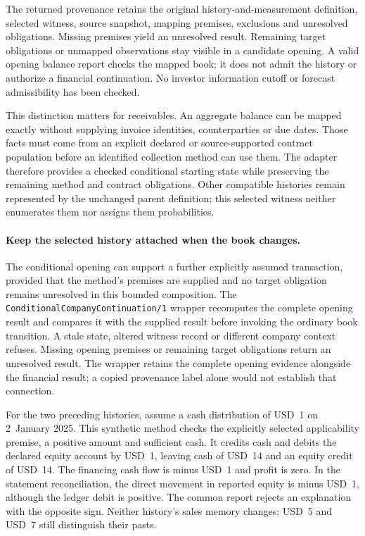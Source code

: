 The returned provenance retains the original history-and-measurement
definition, selected witness, source snapshot, mapping premises, exclusions
and unresolved obligations. Missing premises yield an unresolved result.
Remaining target obligations or unmapped observations stay visible in a
candidate opening. A valid opening balance report checks the mapped book;
it does not admit the history or authorize a financial continuation. No
investor information cutoff or forecast admissibility has been checked.

This distinction matters for receivables. An aggregate balance can be mapped
exactly without supplying invoice identities, counterparties or due dates.
Those facts must come from an explicit declared or source-supported contract
population before an identified collection method can use them. The adapter
therefore provides a checked conditional starting state while preserving the
remaining method and contract obligations. Other compatible histories remain
represented by the unchanged parent definition; this selected witness neither
enumerates them nor assigns them probabilities.


\paragraph{Keep the selected history attached when the book changes.}
The conditional opening can support a further explicitly assumed transaction,
provided that the method's premises are supplied and no target obligation
remains unresolved in this bounded composition. The
\texttt{ConditionalCompanyContinuation/1} wrapper recomputes the complete
opening result and compares it with the supplied result before invoking the
ordinary book transition. A stale state, altered witness record or different
company context refuses. Missing opening premises or remaining target
obligations return an unresolved result. The wrapper retains the complete
opening evidence alongside the financial result; a copied provenance label
alone would not establish that connection.

For the two preceding histories, assume a cash distribution of USD~1 on
2~January 2025. This synthetic method checks the explicitly selected
applicability premise, a positive amount and sufficient cash. It credits cash
and debits the declared equity account by USD~1, leaving cash of USD~14 and
an equity credit of USD~14. The financing cash flow is minus USD~1 and profit
is zero. In the statement reconciliation, the direct movement in reported
equity is minus USD~1, although the ledger debit is positive. The common
report rejects an explanation with the opposite sign. Neither history's
sales memory changes: USD~5 and USD~7 still distinguish their pasts.

